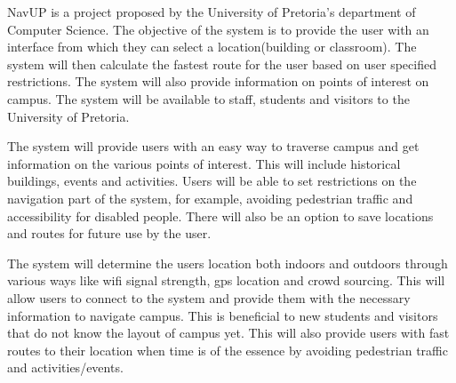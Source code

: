 NavUP is a project proposed by the University of Pretoria's department of Computer Science. The objective of the system is to provide the user with an interface from which they can select a location(building or classroom). The system will then calculate the fastest route for the user based on user specified restrictions. The system will also provide information on points of interest on campus. The system will be available to staff, students and visitors to the University of Pretoria.

The system will provide users with an easy way to traverse campus and get information on the various points of interest. This will include historical buildings, events and activities. Users will be able to set restrictions on the navigation part of the system, for example, avoiding pedestrian traffic and accessibility for disabled people. There will also be an option to save locations and routes for future use by the user.

The system will determine the users location both indoors and outdoors through various ways like wifi signal strength, gps location and crowd sourcing. This will allow users to connect to the system and provide them with the necessary information to navigate campus. This is beneficial to new students and visitors that do not know the layout of campus yet. This will also provide users with fast routes to their location when time is of the essence by avoiding pedestrian traffic and activities/events.
